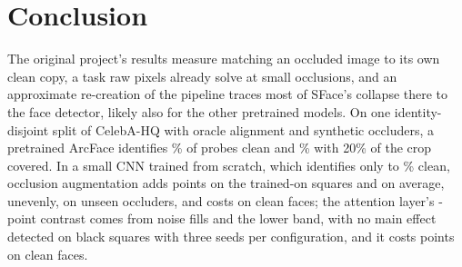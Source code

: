 \section{Conclusion}

The original project's results measure matching an occluded image to its own clean copy, a task raw pixels already solve at small occlusions, and an approximate re-creation of the pipeline traces most of SFace's collapse there to the face detector, likely also for the other pretrained models. On one identity-disjoint split of CelebA-HQ with oracle alignment and synthetic occluders, a pretrained ArcFace identifies \% of probes clean and \% with 20\% of the crop covered. In a small CNN trained from scratch, which identifies only  to \% clean, occlusion augmentation adds  points on the trained-on squares and  on average, unevenly, on unseen occluders, and costs  on clean faces; the attention layer's -point contrast comes from noise fills and the lower band, with no main effect detected on black squares with three seeds per configuration, and it costs  points on clean faces.
